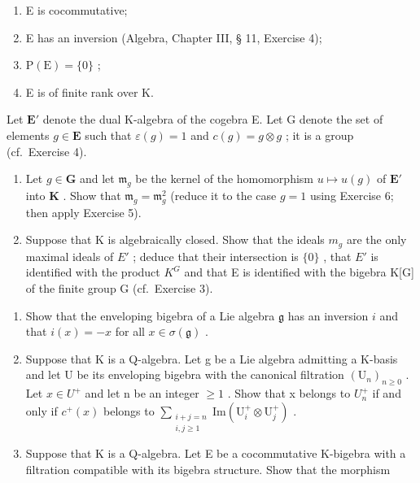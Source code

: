 \begin{enumerate}
\def\labelenumi{(\roman{enumi})}
\item
  E is cocommutative;
\item
  E has an inversion (Algebra, Chapter III, § 11, Exercise 4);
\item
  \(\mathrm{P(E)} = \{0\}\) ;
\item
  E is of finite rank over K.
\end{enumerate}

Let \(\mathbf{E}'\) denote the dual K-algebra of the cogebra E. Let G denote the set of elements \(g \in \mathbf{E}\) such that \(\varepsilon(g) = 1\) and \(c(g) = g \otimes g\) ; it is a group (cf.~Exercise 4).

\begin{enumerate}
\def\labelenumi{(\alph{enumi})}
\item
  Let \(g \in \mathbf{G}\) and let \(\mathfrak{m}_g\) be the kernel of the homomorphism \(u \mapsto u(g)\) of \(\mathbf{E}'\) into \(\mathbf{K}\) . Show that \(\mathfrak{m}_g = \mathfrak{m}_g^2\) (reduce it to the case \(g = 1\) using Exercise 6; then apply Exercise 5).
\item
  Suppose that K is algebraically closed. Show that the ideals \(m_{g}\) are the only maximal ideals of \(E'\) ; deduce that their intersection is \(\{0\}\) , that \(E'\) is identified with the product \(K^{G}\) and that E is identified with the bigebra K[G] of the finite group G (cf.~Exercise 3).
\end{enumerate}

\begin{enumerate}
\def\labelenumi{\arabic{enumi}.}
\setcounter{enumi}{7}
\item
  Show that the enveloping bigebra of a Lie algebra \(\mathfrak{g}\) has an inversion \(i\) and that \(i(x) = -x\) for all \(x \in \sigma(\mathfrak{g})\) .
\item
  Suppose that K is a Q-algebra. Let g be a Lie algebra admitting a K-basis and let U be its enveloping bigebra with the canonical filtration \((\mathrm{U}_{n})_{n\geqslant0}\) . Let \(x\in U^{+}\) and let n be an integer \(\geqslant1\) . Show that x belongs to \(U_{n}^{+}\) if and only if \(c^{+}(x)\) belongs to \(\sum_{\substack{i+j=n\\ i,j\geqslant1}}\mathrm{Im}(\mathrm{U}_{i}^{+}\otimes\mathrm{U}_{j}^{+})\) .
\item
  Suppose that K is a Q-algebra. Let E be a cocommutative K-bigebra with a filtration compatible with its bigebra structure. Show that the morphism
\end{enumerate}

